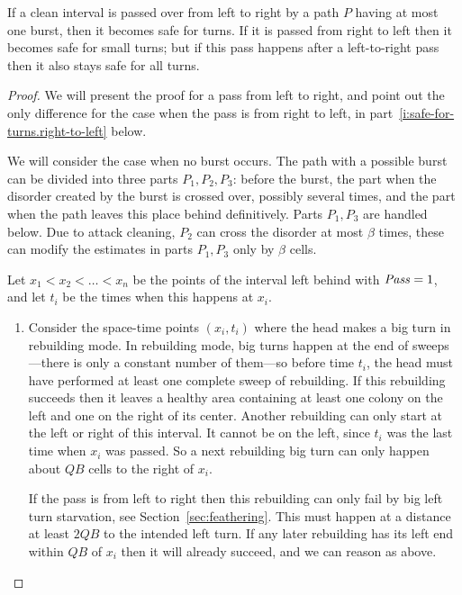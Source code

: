 \documentclass[11pt]{memoir}
\theoremstyle{definition} %
\newcommand{\fld}[1]{\ensuremath{\textit{#1\/}}}
\def\B{B}
\newcommand{\Q}{Q} %
\newcommand{\Pass}{\fld{Pass}} %
\begin{document}
\begin{lemma}\label{lem:safe-for-turns}
  If a clean interval is passed over from left to right by a path \( P \) having at most one burst,
  then it becomes safe for turns.
  If it is passed from right to left then it becomes safe for small turns; but if this pass happens
  after a left-to-right pass then it also stays safe for all turns.
\end{lemma}
\begin{proof}
  We will present the proof for a pass from left to right, and point out the only difference for the case
  when the pass is from right to left, in part~\ref{i:safe-for-turns.right-to-left} below.

  We will consider the case when no burst occurs.
  The path with a possible burst can be divided into three parts \( P_{1},P_{2},P_{3} \):
  before the burst, the part when the
  disorder created by the burst is crossed over, possibly several times,
  and the part when the path leaves this place behind definitively.
  Parts \( P_{1},P_{3} \) are handled below.
  Due to attack cleaning, \( P_{2} \) can cross the disorder at most \( \beta \) times, these can
  modify the estimates in parts \( P_{1},P_{3} \) only by \( \beta \) cells.
  
  Let \( x_{1}<x_{2}<\dots<x_{n} \) be the points of the interval left behind with \( \Pass=1 \), and let
  \( t_{i} \) be the times when this happens at \( x_{i} \).
  \begin{enumerate}
  \item Consider the space-time points \( (x_{i},t_{i}) \)
    where the head makes a big turn in rebuilding mode.
    In rebuilding mode, big turns happen at the end of
    sweeps---there is only a constant number of them---so
    before time \( t_{i} \), the head must have performed at least one complete sweep of rebuilding.
    If this rebuilding succeeds then it leaves a healthy area containing at least one colony on the left and one
    on the right of its center.
    Another rebuilding can only start at the left or right of this interval.
    It cannot be on the left, since \( t_{i} \) was the last time when \( x_{i} \) was passed.
    So a next rebuilding big turn can only happen about \( \Q\B \) cells to the right of \( x_{i} \).

    If the pass is from left to right then 
    this rebuilding can only fail by big left turn starvation, see Section~\ref{sec:feathering}.
    This must happen at a distance at least \( 2\Q\B \) to the intended left turn.
    If any later rebuilding has its left end within \( \Q\B \) of \( x_{i} \)
    then it will already succeed, and we can reason as above.


\end{enumerate}
\end{proof}
\end{document}
